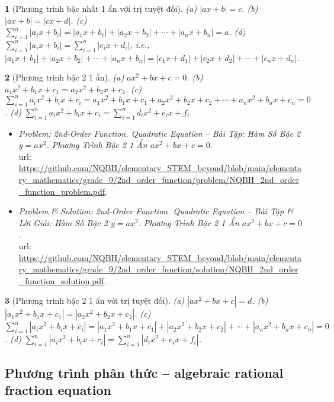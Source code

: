 \documentclass{article}
\newtheorem{baitoan}{}
\begin{document}
\begin{baitoan}[Phương trình bậc nhất 1 ẩn với trị tuyệt đối]
	(a) $|ax + b| = c$. (b) $|ax + b| = |cx + d|$. (c) $\sum_{i=1}^n |a_ix + b_i| = |a_1x + b_1| + |a_2x + b_2| + \cdots + |a_nx + b_n| = a$. (d) $\sum_{i=1}^n |a_ix + b_i| = \sum_{i=1}^n |c_ix + d_i|$, i.e., $|a_1x + b_1| + |a_2x + b_2| + \cdots + |a_nx + b_n| = |c_1x + d_1| + |c_2x + d_2| + \cdots + |c_nx + d_n|$.
\end{baitoan}

\begin{baitoan}[Phương trình bậc 2 1 ẩn]
	(a) $ax^2 + bx + c = 0$. (b) $a_1x^2 + b_1x + c_1 = a_2x^2 + b_2x + c_2$. (c) $\sum_{i=1}^n a_ix^2 + b_ix + c_i = a_1x^2 + b_1x + c_1 + a_2x^2 + b_2x + c_2 + \cdots + a_nx^2 + b_nx + c_n = 0$. (d) $\sum_{i=1}^n a_ix^2 + b_ix + c_i = \sum_{i=1}^n d_ix^2 + e_ix + f_i$.
\end{baitoan}

\begin{itemize}
	\item \textit{Problem: 2nd-Order Function. Quadratic Equation -- Bài Tập: Hàm Số Bậc 2 $y = ax^2$. Phương Trình Bậc 2 1 Ẩn $ax^2 + bx + c = 0$}.\\{\sc url}: \url{https://github.com/NQBH/elementary_STEM_beyond/blob/main/elementary_mathematics/grade_9/2nd_order_function/problem/NQBH_2nd_order_function_problem.pdf}.
	\item \textit{Problem \& Solution: 2nd-Order Function. Quadratic Equation -- Bài Tập \& Lời Giải: Hàm Số Bậc 2 $y = ax^2$. Phương Trình Bậc 2 1 Ẩn $ax^2 + bx + c = 0$}.\\{\sc url}: \url{https://github.com/NQBH/elementary_STEM_beyond/blob/main/elementary_mathematics/grade_9/2nd_order_function/solution/NQBH_2nd_order_function_solution.pdf}.
\end{itemize}

\begin{baitoan}[Phương trình bậc 2 1 ẩn với trị tuyệt đối]
	(a) $|ax^2 + bx + c| = d$. (b) $|a_1x^2 + b_1x + c_1| = |a_2x^2 + b_2x + c_2|$. (c) $\sum_{i=1}^n |a_ix^2 + b_ix + c_i| = |a_1x^2 + b_1x + c_1| + |a_2x^2 + b_2x + c_2| + \cdots + |a_nx^2 + b_nx + c_n| = 0$. (d) $\sum_{i=1}^n |a_ix^2 + b_ix + c_i| = \sum_{i=1}^n |d_ix^2 + e_ix + f_i|$.
\end{baitoan}

\subsection{Phương trình phân thức -- algebraic rational fraction equation}
\end{document}
